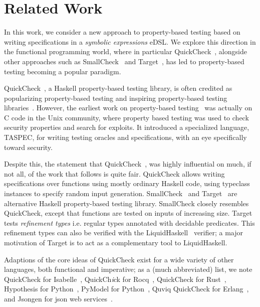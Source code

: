 \section{Related Work}

In this work, we consider a new approach to property-based testing
based on writing specifications in a \textit{symbolic expressions} eDSL.
We explore this direction in the functional programming world,
where in particular QuickCheck~\cite{claessen2000quickcheck},
alongside other approaches such as SmallCheck~\cite{runciman2008smallcheck}
and Target~\cite{seidel2015type},
has led to property-based testing becoming a popular paradigm.

QuickCheck~\cite{claessen2000quickcheck}, a Haskell property-based testing library, is often credited as popularizing
property-based testing and inspiring
property-based testing libraries~\cite{maciver2019hypothesis,benac2014jsongen,denes2014quickchick,seidel2015type}.
However,
the earliest work on property-based testing~\cite{fink1994property,fink1997property}
was actually on C code in the Unix community,
where property based testing was used to check security properties and search for exploits.
It introduced a specialized language, TASPEC, for writing testing oracles and specifications,
with an eye specifically toward security.

Despite this, the statement that QuickCheck~\cite{claessen2000quickcheck},
was highly influential on much, if not all,
of the work that follows is quite fair.
QuickCheck allows writing specifications over functions using mostly ordinary Haskell code,
using typeclass instances to specify random input generation.
SmallCheck~\cite{runciman2008smallcheck} and Target~\cite{seidel2015type}
are alternative Haskell property-based testing library.
SmallCheck closely resembles QuickCheck,
except that
functions are tested on inputs of increasing size.
Target tests \textit{refinement types}
i.e. regular types annotated with decidable predicates.
This refinement types can also be verified with the LiquidHaskell~\cite{vazou2014refinement} verifier;
a major motivation of Target is to act as a complementary tool to LiquidHaskell.

Adaptions of the core ideas of QuickCheck
exist for a wide variety of other languages, both functional and imperative;
as a (much abbreviated) list,
we note QuickCheck for Isabelle~\cite{bulwahn2012new},
QuickCh\textit{i}ck for Rocq~\cite{denes2014quickchick},
QuickCheck for Rust~\cite{derbenwick2025property},
Hypothesis for Python~\cite{maciver2019hypothesis},
PyModel for Python~\cite{jacky2011pymodel},
Quviq QuickCheck for Erlang~\cite{arts2008testing},
and 
Jsongen for json web services~\cite{benac2014jsongen}.

